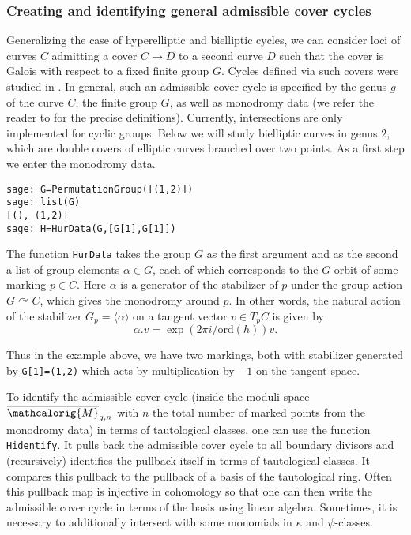 \documentclass[11pt]{article}
\newcommand{\M}{\ensuremath{\overline{\mathcalorig{M}}}}
\begin{document}
\subsubsection{Creating and identifying general admissible cover cycles}
Generalizing the case of hyperelliptic and bielliptic cycles, we can consider loci of curves $C$ admitting a cover $C \to D$ to a second curve $D$ such that the cover is Galois with respect to a fixed finite group $G$. Cycles defined via such covers were studied in
\cite{schmittvanzelm}.
In general, such an admissible cover cycle is specified by the genus $g$ of the curve $C$, the finite group $G$, as well as monodromy data (we refer the reader to \cite[Section 1.3]{schmittvanzelm} for the precise definitions). Currently, intersections are only implemented for cyclic groups. Below we will study bielliptic curves in genus $2$, which are double covers of elliptic curves branched over two points. As a first step we enter the monodromy data.
\begin{lstlisting}
sage: G=PermutationGroup([(1,2)])
sage: list(G)
[(), (1,2)]
sage: H=HurData(G,[G[1],G[1]])
\end{lstlisting}

The function \verb|HurData| takes the group $G$ as the first argument and as the second a list of group elements $\alpha \in G$, each of which corresponds to the $G$-orbit of some marking $p \in C$. Here $\alpha$ is a generator of the stabilizer of $p$ under the group action $G \curvearrowright C$, which gives the monodromy around $p$. In other words, the natural action of the stabilizer $G_p = \langle \alpha \rangle$ on a tangent vector $v \in T_p C$ is given by \[\alpha . v = \exp(2 \pi i/\mathrm{ord}(h)) v.\]

Thus in the example above, we have two markings, both with stabilizer generated by \verb|G[1]=(1,2)| which acts by multiplication by $-1$ on the tangent space.

To identify the admissible cover cycle (inside the moduli space $\M_{g,n}$ with $n$ the total number of marked points from the monodromy data) in terms of tautological classes, one can use the function \verb|Hidentify|.
It pulls back the admissible cover cycle to all boundary divisors and (recursively) identifies the pullback itself in terms of tautological classes. It compares this pullback to the pullback of a basis of the tautological ring. Often this pullback map is injective in cohomology so that one can then write the admissible cover cycle in terms of the basis using linear algebra. Sometimes, it is necessary to additionally intersect with some monomials in $\kappa$ and $\psi$-classes.
\end{document}
